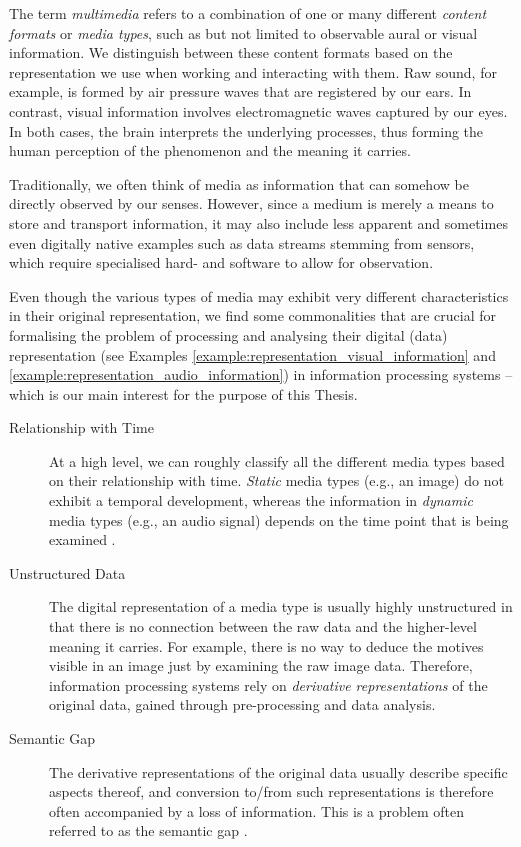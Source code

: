 The term \emph{multimedia} refers to a combination of one or many different \emph{content formats} or \emph{media types}, such as but not limited to observable aural or visual information. We distinguish between these content formats based on the representation we use when working and interacting with them. Raw sound, for example, is formed by air pressure waves that are registered by our ears. In contrast, visual information involves electromagnetic waves captured by our eyes. In both cases, the brain interprets the underlying processes, thus forming the human perception of the phenomenon and the meaning it carries.

Traditionally, we often think of media as information that can somehow be directly observed by our senses. However, since a medium is merely a means to store and transport information, it may also include less apparent and sometimes even digitally native examples such as data streams stemming from sensors, which require specialised hard- and software to allow for observation.

Even though the various types of media may exhibit very different characteristics in their original representation, we find some commonalities that are crucial for formalising the problem of processing and analysing their digital (data) representation (see Examples \ref{example:representation_visual_information} and \ref{example:representation_audio_information}) in information processing systems -- which is our main interest for the purpose of this Thesis.

\begin{description}
    \item[Relationship with Time] At a high level, we can roughly classify all the different media types based on their relationship with time. \emph{Static} media types (e.g., an image) do not exhibit a temporal development, whereas the information in \emph{dynamic} media types (e.g., an audio signal) depends on the time point that is being examined \cite{Blanken:2007multimedia}.

    \item[Unstructured Data] The digital representation of a media type is usually highly unstructured in that there is no connection between the raw data and the higher-level meaning it carries. For example, there is no way to deduce the motives visible in an image just by examining the raw image data. Therefore, information processing systems rely on \emph{derivative representations} of the original data, gained through pre-processing and data analysis.
    
    \item[Semantic Gap] The derivative representations of the original data usually describe specific aspects thereof, and conversion to/from such representations is therefore often accompanied by a loss of information. This is a problem often referred to as the semantic gap \cite{Smeulders:2000Content,Blanken:2007multimedia}.
\end{description}

